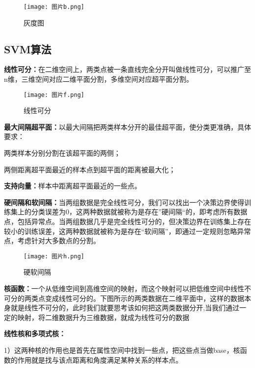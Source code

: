 \documentclass[10.5pt,compsoc,UTF8]{CjC}
\theoremstyle{mystyle}
\begin{document}
\begin{figure}[h] %
    \centering %
    \texttt{[image: 图片b.png]} %
    \caption{灰度图} %
\end{figure}

\subsection{SVM算法}
\textbf{线性可分：}在二维空间上，两类点被一条直线完全分开叫做线性可分，可以推广至n维，三维空间对应二维平面分割，多维空间对应超平面分割。

\begin{figure}[h] %
    \centering %
    \texttt{[image: 图片f.png]} %
    \caption{线性可分} %
\end{figure}

\textbf{最大间隔超平面：}以最大间隔把两类样本分开的最佳超平面，使分类更准确，具体要求：

两类样本分别分割在该超平面的两侧；

两侧距离超平面最近的样本点到超平面的距离被最大化；

\textbf{支持向量：}样本中距离超平面最近的一些点。



\textbf{硬间隔和软间隔：}当两组数据是完全线性可分，我们可以找出一个决策边界使得训练集上的分类误差为0，这两种数据就被称为是存在”硬间隔“的，即考虑所有数据点，包括异常点。当两组数据几乎是完全线性可分的，但决策边界在训练集上存在较小的训练误差，这两种数据就被称为是存在“软间隔”，即通过一定规则忽略异常点，考虑针对大多数点的分割。

\begin{figure}[h] %
    \centering %
    \texttt{[image: 图片h.png]} %
    \caption{硬软间隔} %
\end{figure}

\textbf{核函数：}一个从低维空间到高维空间的映射，而这个映射可以把低维空间中线性不可分的两类点变成线性可分的。下图所示的两类数据在二维平面中，这样的数据本身就是线性不可分的，此时我们就要思考该如何把这两类数据分开,当我们通过一定的映射，将二维数据升为三维数据，就成为线性可分的数据

\textbf{线性核和多项式核：}

1）这两种核的作用也是首先在属性空间中找到一些点，把这些点当做base，核函数的作用就是找与该点距离和角度满足某种关系的样本点。
\end{document}
